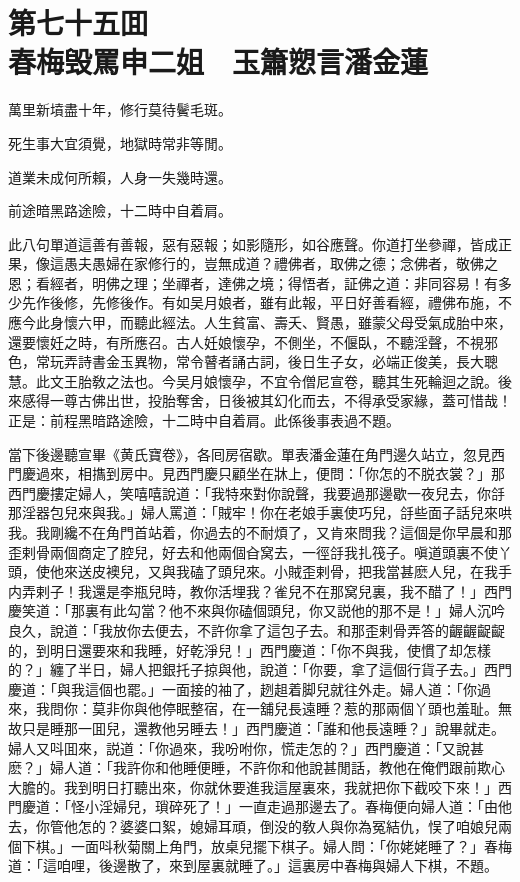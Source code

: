 
\chapter*{第七十五囬　\\春梅毁罵申二姐　玉簫愬言潘金蓮}


\begin{myquote}
萬里新墳盡十年，修行莫待鬢毛斑。

死生事大宜須覺，地獄時常非等閒。

道業未成何所賴，人身一失幾時還。

前途暗黑路途險，十二時中自着肩。
\end{myquote}

此八句單道這善有善報，惡有惡報；如影隨形，如谷應聲。你道打坐參禪，皆成正果，像這愚夫愚婦在家修行的，豈無成道？禮佛者，取佛之德；念佛者，敬佛之恩；看經者，明佛之理；坐禪者，達佛之境；得悟者，証佛之道：非同容易！有多少先作後修，先修後作。有如吴月娘者，雖有此報，平日好善看經，禮佛布施，不應今此身懷六甲，而聽此經法。人生貧富、壽夭、賢愚，雖蒙父母受氣成胎中來，還要懷妊之時，有所應召。古人妊娘懷孕，不側坐，不偃臥，不聽淫聲，不視邪色，常玩弄詩書金玉異物，常令瞽者誦古詞，後日生子女，必端正俊美，長大聰慧。此文王胎敎之法也。今吴月娘懷孕，不宜令僧尼宣卷，聽其生死輪迴之說。後來感得一尊古佛出世，投胎奪舍，日後被其幻化而去，不得承受家緣，蓋可惜哉！正是：前程黑暗路途險，十二時中自着肩。此係後事表過不題。

當下後邊聽宣畢《黄氏寶卷》，各囘房宿歇。單表潘金蓮在角門邊久站立，忽見西門慶過來，相㩦到房中。見西門慶只顧坐在牀上，便問：「你怎的不脱衣裳？」那西門慶摟定婦人，笑嘻嘻說道：「我特來對你說聲，我要過那邊歇一夜兒去，你㧱那淫器包兒來與我。」婦人罵道：「賊牢！你在老娘手裏使巧兒，㧱些面子話兒來哄我。我剛纔不在角門首站着，你過去的不耐煩了，又肯來問我？這個是你早晨和那歪剌骨兩個商定了腔兒，好去和他兩個㒲窝去，一徑㧱我扎筏子。嗔道頭裏不使丫頭，使他來送皮襖兒，又與我磕了頭兒來。小賊歪剌骨，把我當甚麽人兒，在我手内弄剌子！我還是李瓶兒時，教你活埋我？雀兒不在那窝兒裏，我不醋了！」西門慶笑道：「那裏有此勾當？他不來與你磕個頭兒，你又説他的那不是！」婦人沉吟良久，說道：「我放你去便去，不許你拿了這包子去。和那歪剌骨弄答的齷齷齪齪的，到明日還要來和我睡，好乾淨兒！」西門慶道：「你不與我，使慣了却怎樣的？」纏了半日，婦人把銀托子掠與他，說道：「你要，拿了這個行貨子去。」西門慶道：「與我這個也罷。」一面接的袖了，趔趄着脚兒就往外走。婦人道：「你過來，我問你：莫非你與他停眠整宿，在一舖兒長遠睡？惹的那兩個丫頭也羞耻。無故只是睡那一囬兒，還教他另睡去！」西門慶道：「誰和他長遠睡？」說畢就走。婦人又呌囬來，説道：「你過來，我吩咐你，慌走怎的？」西門慶道：「又說甚麽？」婦人道：「我許你和他睡便睡，不許你和他說甚閒話，教他在俺們跟前欺心大膽的。我到明日打聽出來，你就休要進我這屋裏來，我就把你下截咬下來！」西門慶道：「怪小淫婦兒，瑣碎死了！」一直走過那邊去了。春梅便向婦人道：「由他去，你管他怎的？婆婆口絮，媳婦耳頑，倒没的敎人與你為冤結仇，悮了咱娘兒兩個下棋。」一面呌秋菊關上角門，放桌兒擺下棋子。婦人問：「你姥姥睡了？」春梅道：「這咱哩，後邊散了，來到屋裏就睡了。」這裏房中春梅與婦人下棋，不題。

